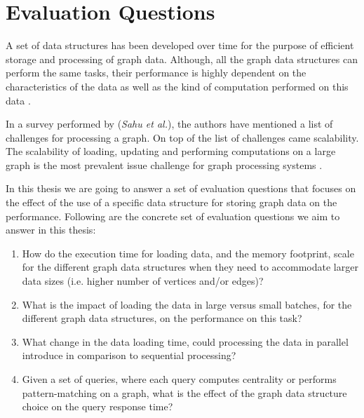 {\section{Evaluation Questions}
\label{sec:EvalQuests}

A set of data structures has been developed over time for the purpose of efficient storage and processing of graph data. Although, all the graph data structures can perform the same tasks, their performance is highly dependent on the characteristics of the data as well as the kind of computation performed on this data \cite{Paradies2017}.

In a survey performed by (\textit{Sahu et al.}), the authors have mentioned a list of challenges for processing a graph. On top of the list of challenges came scalability. The scalability of loading, updating and performing computations on a large graph is the most prevalent issue challenge for graph processing systems \cite{sahu2017ubiquity}.

In this thesis we are going to answer a set of evaluation questions that focuses on the effect of the use of a specific data structure for storing graph data on the performance. Following are the concrete set of evaluation questions we aim to answer in this thesis:

\begin{enumerate}
\item How do the execution time for loading data, and the memory footprint, scale for the different graph data structures when they need to accommodate larger data sizes (i.e. higher number of vertices and/or edges)? 
\item What is the impact of loading the data in large versus small batches, for the different graph data structures, on the performance on this task?
\item What change in the data loading time, could processing the data in parallel introduce in comparison to sequential processing?
\item Given a set of queries, where each query computes centrality or performs pattern-matching on a graph, what is the effect of the graph data structure choice on the query response time?%


\end{enumerate}}
